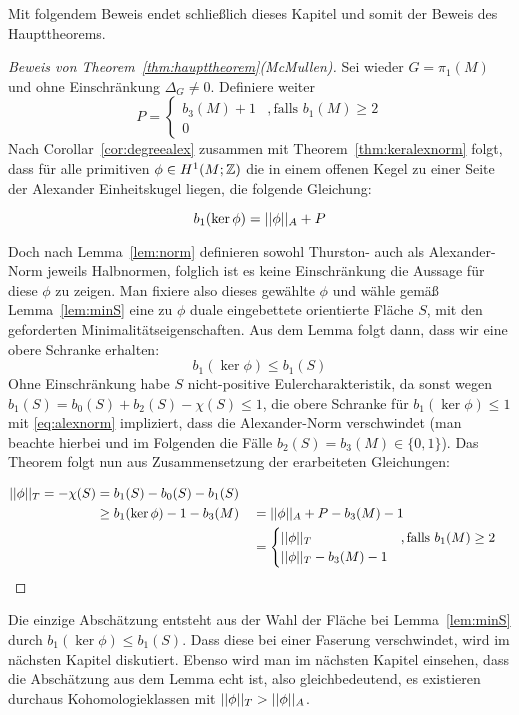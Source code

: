 Mit folgendem Beweis endet schließlich dieses Kapitel und somit der Beweis des Haupttheorems.

\begin{proof}[Beweis von Theorem~\ref{thm:haupttheorem}(McMullen)]
	Sei wieder $G=\pi_1(M)$ und ohne Einschränkung $\Delta_G\neq 0$. Definiere weiter \[
	P=\begin{cases}
		b_3(M)+1 &, \text{falls } b_1(M) \geq 2	\\
		0
	\end{cases}
	\]	
	Nach Corollar~\ref{cor:degreealex} zusammen mit Theorem~\ref{thm:keralexnorm} folgt, dass für alle primitiven $\phi \in H^1(M;\mathbb{Z})$ die in einem offenen Kegel zu einer Seite der Alexander Einheitskugel liegen, die folgende Gleichung:
	
		\begin{equation}
		b_1(\ker\phi)= ||\phi||_A + P \label{eq:alexnorm}
		\end{equation}
	
	Doch nach Lemma~\ref{lem:norm} definieren sowohl Thurston- auch als Alexander-Norm jeweils Halbnormen, folglich ist es keine Einschränkung die Aussage für diese $\phi$ zu zeigen. Man fixiere also dieses gewählte $\phi$ und wähle gemäß Lemma~\ref{lem:minS} eine zu $\phi$ duale eingebettete orientierte Fläche $S$, mit den geforderten Minimalitätseigenschaften. Aus dem Lemma folgt dann, dass wir eine obere Schranke erhalten:
	\begin{equation}
		b_1(\ker\phi) \leq b_1(S) \label{eq:obereSchrankeS}
	\end{equation}
	Ohne Einschränkung habe $S$ nicht-positive Eulercharakteristik, da sonst wegen $b_1(S)= b_0(S) + b_2(S) - \chi(S) \leq 1$, die obere Schranke für $b_1(\ker\phi)\leq 1$  mit \eqref{eq:alexnorm} impliziert, dass die Alexander-Norm verschwindet (man beachte hierbei und im Folgenden die Fälle $b_2(S)=b_3(M) \in \{0,1\}$). Das Theorem folgt nun aus Zusammensetzung der erarbeiteten Gleichungen:
	
		\begin{align*}
		||\phi||_T = -\chi(S) &= b_1(S)-b_0(S)-b_1(S)\\
					&\geq b_1(\ker\phi) -1-b_3(M) &&= ||\phi||_A +P -b_3(M)-1\\
					&&& = \begin{cases}
						||\phi||_T &, \text{falls } b_1(M)\geq 2\\
						||\phi||_T -b_3(M)-1
					\end{cases}
		\end{align*}
\end{proof} 
	Die einzige Abschätzung entsteht aus der Wahl der Fläche bei Lemma~\ref{lem:minS} durch $b_1(\ker\phi)\leq b_1(S)$. Dass diese bei einer Faserung verschwindet, wird im nächsten Kapitel diskutiert. Ebenso wird man im nächsten Kapitel einsehen, dass die Abschätzung aus dem Lemma echt ist, also gleichbedeutend, es existieren durchaus Kohomologieklassen mit $||\phi||_T > ||\phi||_A$.